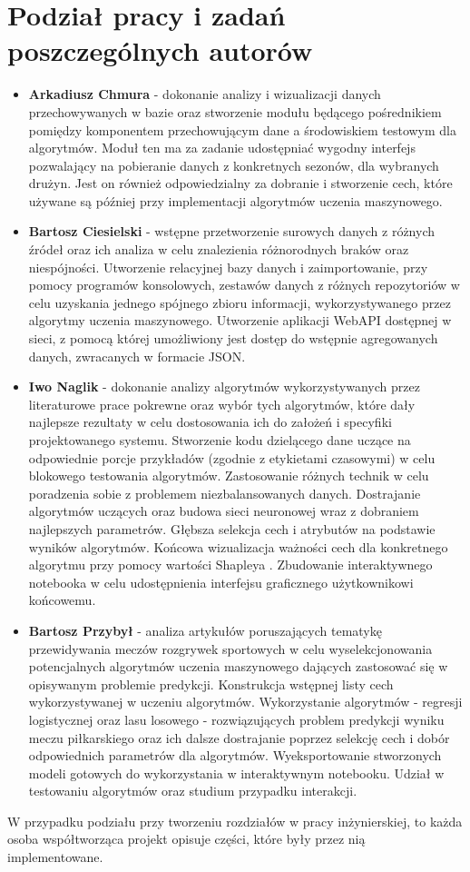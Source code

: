 \section{Podział pracy i zadań poszczególnych autorów}
\begin{itemize}
    \item \textbf{Arkadiusz Chmura} - dokonanie analizy i wizualizacji danych przechowywanych w bazie oraz stworzenie modułu będącego pośrednikiem pomiędzy komponentem przechowującym dane a środowiskiem testowym dla algorytmów. Moduł ten ma za zadanie udostępniać wygodny interfejs pozwalający na pobieranie danych z konkretnych sezonów, dla wybranych drużyn. Jest on również odpowiedzialny za dobranie i stworzenie cech, które używane są później przy implementacji algorytmów uczenia maszynowego.
    \item \textbf{Bartosz Ciesielski} - wstępne przetworzenie surowych danych z różnych źródeł oraz ich analiza w celu znalezienia różnorodnych braków oraz niespójności. Utworzenie relacyjnej bazy danych i zaimportowanie, przy pomocy programów konsolowych, zestawów danych z różnych repozytoriów w celu uzyskania jednego spójnego zbioru informacji, wykorzystywanego przez algorytmy uczenia maszynowego. Utworzenie aplikacji WebAPI  dostępnej w sieci, z pomocą której umożliwiony jest dostęp do wstępnie agregowanych danych, zwracanych w formacie JSON.
    \item \textbf{Iwo Naglik} - dokonanie analizy algorytmów wykorzystywanych przez literaturowe prace pokrewne oraz wybór tych algorytmów, które dały najlepsze rezultaty w celu dostosowania ich do założeń i specyfiki projektowanego systemu. Stworzenie kodu dzielącego dane uczące na odpowiednie porcje przykładów (zgodnie z etykietami czasowymi) w celu blokowego testowania algorytmów. Zastosowanie różnych technik w celu poradzenia sobie z problemem niezbalansowanych danych. Dostrajanie algorytmów uczących oraz budowa sieci neuronowej wraz z dobraniem najlepszych parametrów. Głębsza selekcja cech i atrybutów na podstawie wyników algorytmów. Końcowa wizualizacja ważności cech dla konkretnego algorytmu przy pomocy wartości Shapleya \cite{shapley}. Zbudowanie interaktywnego notebooka w celu udostępnienia interfejsu graficznego użytkownikowi końcowemu.
    \item \textbf{Bartosz Przybył} - analiza artykułów poruszających tematykę przewidywania meczów rozgrywek sportowych w celu wyselekcjonowania potencjalnych algorytmów uczenia maszynowego dających zastosować się w opisywanym problemie predykcji. Konstrukcja wstępnej listy cech wykorzystywanej w uczeniu algorytmów. Wykorzystanie algorytmów - regresji logistycznej oraz lasu losowego - rozwiązujących problem predykcji wyniku meczu piłkarskiego oraz ich dalsze dostrajanie poprzez selekcję cech i dobór odpowiednich parametrów dla algorytmów. Wyeksportowanie stworzonych modeli gotowych do wykorzystania w interaktywnym notebooku. Udział w testowaniu algorytmów oraz studium przypadku interakcji.
\end{itemize}
W przypadku podziału przy tworzeniu rozdziałów w pracy inżynierskiej, to każda osoba współtworząca projekt opisuje części, które były przez nią implementowane.